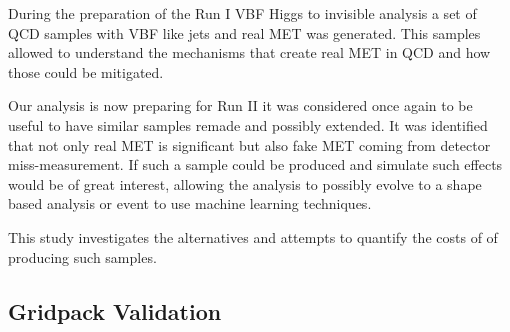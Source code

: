 During the preparation of the Run I \gls{VBF} Higgs to invisible analysis a set of \gls{QCD} samples with \gls{VBF} like jets and real \gls{MET} was generated. This samples allowed to understand the mechanisms that create real \gls{MET} in \gls{QCD} and how those could be mitigated.

Our analysis is now preparing for Run II it was considered once again to be useful to have similar samples remade and possibly extended. It was identified that not only real \gls{MET} is significant but also fake \gls{MET} coming from detector miss-measurement. If such a sample could be produced and simulate such effects would be of great interest, allowing the analysis to possibly evolve to a shape based analysis or event to use machine learning techniques.

This study investigates the alternatives and attempts to quantify the costs of of producing such samples.








% 
% 
% 

\subsection{Gridpack Validation}
\label{SUBSECTION:GridpackValidation}





